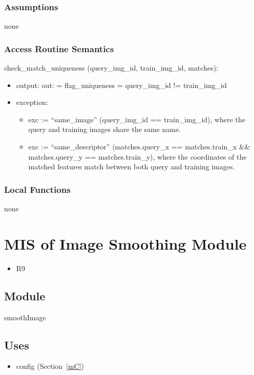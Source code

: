 \documentclass[12pt, titlepage]{article}
\begin{document}
\subsubsection{Assumptions}
none

\subsubsection{Access Routine Semantics}

\noindent check\_match\_uniqueness (query\_img\_id, train\_img\_id, matches):
\begin{itemize}
  \item output: out: = flag\_uniqueness = query\_img\_id != train\_img\_id
  \item exception:
  \begin{itemize}
    \item exc := ``same\_image'' \textbar{} (query\_img\_id == train\_img\_id), where the query and training images share the same name.
    \item exc := ``same\_descriptor'' \textbar{} (matches.query\_x == matches.train\_x \&\& matches.query\_y == matches.train\_y), where the coordinates of the matched features match between both query and training images.
  \end{itemize}
\end{itemize}


\subsubsection{Local Functions}
none


\newpage
\section{MIS of Image Smoothing Module} \label{mIS}
\begin{itemize}
  \item R9
\end{itemize}
\subsection{Module}
smoothImage

\subsection{Uses}
\begin{itemize}
  \item config (Section~\ref{mC})
\end{itemize}
\end{document}
